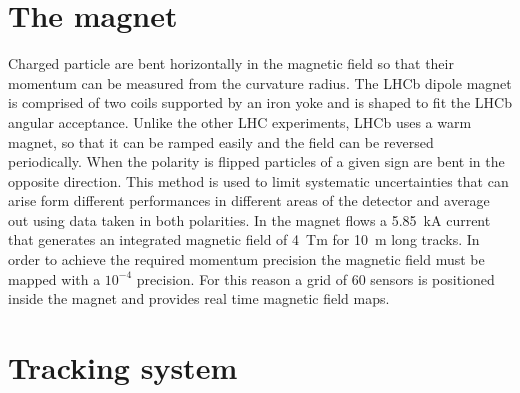 \section{The magnet}

Charged particle are bent horizontally in the magnetic field
so that their momentum can be measured from the curvature radius.
The LHCb dipole magnet is comprised of two coils supported by an iron yoke
and is shaped to fit the LHCb angular acceptance. Unlike the other LHC experiments,
LHCb uses a warm magnet, so that it can be ramped easily and the field can be reversed periodically.
When the polarity is flipped particles of a given sign are bent in the opposite direction. 
This method is used to limit systematic uncertainties that can arise form different performances
in different areas of the detector and average out using data taken in both polarities.
In the magnet flows a 5.85~kA current that generates an integrated magnetic field of 4~Tm for 10~m long tracks.
In order to achieve the required momentum precision the magnetic field must be mapped with
a $10^{-4}$ precision. For this reason a grid of 60 sensors is positioned inside the magnet
and provides real time magnetic field maps.

\section{Tracking system}
\label{sec:tracking}

